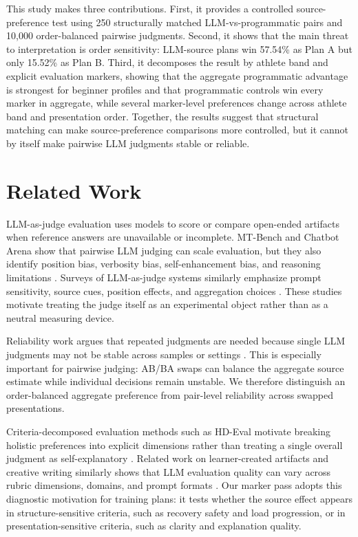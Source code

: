 \documentclass[11pt]{article}
\begin{document}
This study makes three contributions. First, it provides a controlled source-preference test using 250 structurally matched LLM-vs-programmatic pairs and 10,000 order-balanced pairwise judgments. Second, it shows that the main threat to interpretation is order sensitivity: LLM-source plans win 57.54\% as Plan A but only 15.52\% as Plan B. Third, it decomposes the result by athlete band and explicit evaluation markers, showing that the aggregate programmatic advantage is strongest for beginner profiles and that programmatic controls win every marker in aggregate, while several marker-level preferences change across athlete band and presentation order. Together, the results suggest that structural matching can make source-preference comparisons more controlled, but it cannot by itself make pairwise LLM judgments stable or reliable.

\section{Related Work}

LLM-as-judge evaluation uses models to score or compare open-ended artifacts when reference answers are unavailable or incomplete. MT-Bench and Chatbot Arena show that pairwise LLM judging can scale evaluation, but they also identify position bias, verbosity bias, self-enhancement bias, and reasoning limitations \citep{zheng2023llmasajudge}. Surveys of LLM-as-judge systems similarly emphasize prompt sensitivity, source cues, position effects, and aggregation choices \citep{gu2024language}. These studies motivate treating the judge itself as an experimental object rather than as a neutral measuring device.

Reliability work argues that repeated judgments are needed because single LLM judgments may not be stable across samples or settings \citep{schroeder2025trustllmjudgmentsreliability}. This is especially important for pairwise judging: AB/BA swaps can balance the aggregate source estimate while individual decisions remain unstable. We therefore distinguish an order-balanced aggregate preference from pair-level reliability across swapped presentations.

Criteria-decomposed evaluation methods such as HD-Eval motivate breaking holistic preferences into explicit dimensions rather than treating a single overall judgment as self-explanatory \citep{liu2024hdevalaligninglargelanguage}. Related work on learner-created artifacts and creative writing similarly shows that LLM evaluation quality can vary across rubric dimensions, domains, and prompt formats \citep{tian2024evaluating,kim2025llms}. Our marker pass adopts this diagnostic motivation for training plans: it tests whether the source effect appears in structure-sensitive criteria, such as recovery safety and load progression, or in presentation-sensitive criteria, such as clarity and explanation quality.
\end{document}
